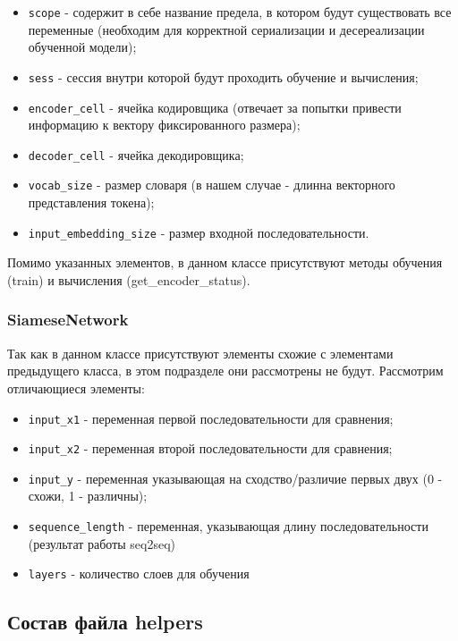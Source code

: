 \begin{itemize}
\setlength\itemsep{0mm}
\item \texttt{scope} - содержит в себе название предела, в котором будут существовать все переменные (необходим для корректной сериализации и десереализации обученной модели);
\item \texttt{sess} - сессия внутри которой будут проходить обучение и вычисления;
\item \texttt{encoder\_cell} - ячейка кодировщика (отвечает за попытки привести информацию к вектору фиксированного размера);
\item \texttt{decoder\_cell} - ячейка декодировщика;
\item \texttt{vocab\_size} - размер словаря (в нашем случае - длинна векторного представления токена);
\item \texttt{input\_embedding\_size} - размер входной последовательности.
\end{itemize}

Помимо указанных элементов, в данном классе присутствуют методы обучения (train) и вычисления (get\_encoder\_status).

\subsubsection{SiameseNetwork}

Так как в данном классе присутствуют элементы схожие с элементами предыдущего класса, в этом подразделе они рассмотрены не будут. Рассмотрим отличающиеся элементы:

\begin{itemize}
\setlength\itemsep{0mm}
\item \texttt{input\_x1} - переменная первой последовательности для сравнения;
\item \texttt{input\_x2} - переменная второй последовательности для сравнения;
\item \texttt{input\_y} - переменная указывающая на сходство/различие первых двух (0 - схожи, 1 - различны);
\item \texttt{sequence\_length} - переменная, указывающая длину последовательности (результат работы seq2seq)
\item \texttt{layers} - количество слоев для обучения
\end{itemize}

\subsection{Состав файла helpers}

